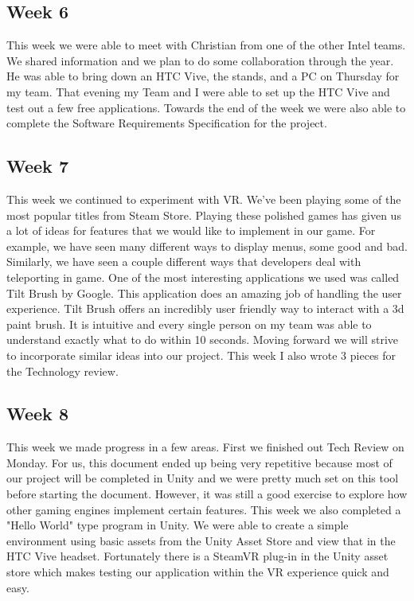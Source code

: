 \documentclass[10pt,journal,compsoc,onecolumn, draftclsnofoot]{IEEEtran}
\begin{document}
\subsection{Week 6}
This week we were able to meet with Christian from one of the other Intel teams.
We shared information and we plan to do some collaboration through the year.
He was able to bring down an HTC Vive, the stands, and a PC on Thursday for my team.
That evening my Team and I were able to set up the HTC Vive and test out a few free applications.
Towards the end of the week we were also able to complete the Software Requirements Specification for the project.

\subsection{Week 7}
This week we continued to experiment with VR. We've been playing some of the most popular titles from Steam Store.
Playing these polished games has given us a lot of ideas for features that we would like to implement in our game.
For example, we have seen many different ways to display menus, some good and bad.
Similarly, we have seen a couple different ways that developers deal with teleporting in game.
One of the most interesting applications we used was called Tilt Brush by Google.
This application does an amazing job of handling the user experience.
Tilt Brush offers an incredibly user friendly way to interact with a 3d paint brush.
It is intuitive and every single person on my team was able to understand exactly what to do within 10 seconds.
Moving forward we will strive to incorporate similar ideas into our project.
This week I also wrote 3 pieces for the Technology review.

\subsection{Week 8}
This week we made progress in a few areas. First we finished out Tech Review on Monday.
For us, this document ended up being very repetitive because most of our project will be completed in Unity and we were pretty much set on this tool before starting the document.
However, it was still a good exercise to explore how other gaming engines implement certain features.
This week we also completed a "Hello World" type program in Unity.
We were able to create a simple environment using basic assets from the Unity Asset Store and view that in the HTC Vive headset.
Fortunately there is a SteamVR plug-in in the Unity asset store which makes testing our application within the VR experience quick and easy.
\end{document}
